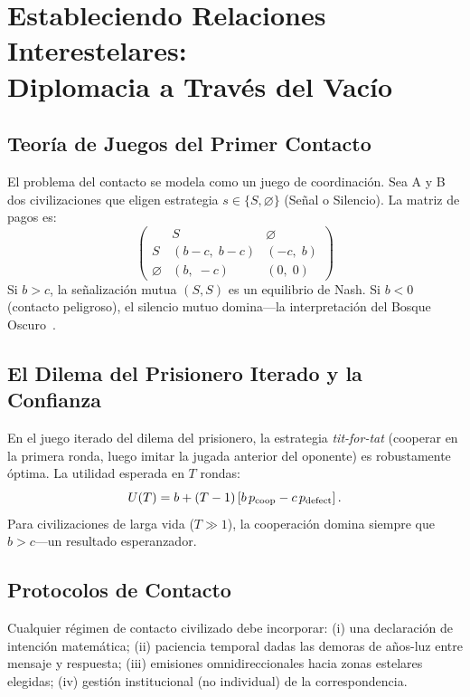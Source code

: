 \documentclass[12pt,a4paper]{article}
\begin{document}
\section[Estableciendo Relaciones Interestelares: Diplomacia a Través del Vacío]{Estableciendo Relaciones Interestelares:\\Diplomacia a Través del Vacío}

\subsection{Teoría de Juegos del Primer Contacto}

El problema del contacto se modela como un juego de coordinación. Sea A y B
dos civilizaciones que eligen estrategia $s \in \{S, \varnothing\}$ (Señal o
Silencio). La matriz de pagos es:
\begin{equation}
\begin{pmatrix}
  & S & \varnothing \\
  S & (b-c,\; b-c) & (-c,\; b) \\
  \varnothing & (b,\; -c) & (0,\; 0)
\end{pmatrix}
\end{equation}
Si $b > c$, la señalización mutua $(S, S)$ es un equilibrio de Nash. Si $b < 0$
(contacto peligroso), el silencio mutuo domina---la interpretación del Bosque
Oscuro~\citep{Liu2008}.

\subsection{El Dilema del Prisionero Iterado y la Confianza}

En el juego iterado del dilema del prisionero, la estrategia
\emph{tit-for-tat} (cooperar en la primera ronda, luego imitar la jugada
anterior del oponente) es robustamente óptima. La utilidad esperada en $T$
rondas:
\begin{equation}
  U(T) = b + (T-1)\left[b\,p_{\rm coop} - c\,p_{\rm defect}\right].
\end{equation}
Para civilizaciones de larga vida ($T \gg 1$), la cooperación domina siempre
que $b > c$---un resultado esperanzador.

\subsection{Protocolos de Contacto}

Cualquier régimen de contacto civilizado debe incorporar:
(i) una declaración de intención matemática; (ii) paciencia temporal dadas
las demoras de años-luz entre mensaje y respuesta; (iii) emisiones
omnidireccionales hacia zonas estelares elegidas; (iv) gestión institucional
(no individual) de la correspondencia.
\end{document}
